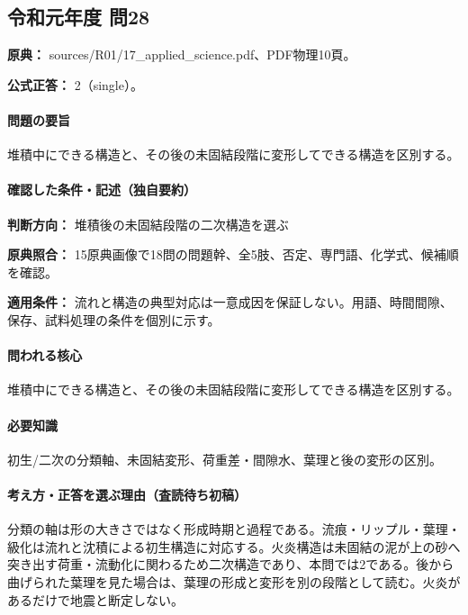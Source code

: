 \subsection{令和元年度 問28}
\label{q:r01-reg-applied-28}

\noindent\textbf{原典：} sources/R01/17\_applied\_science.pdf、PDF物理10頁。

\textbf{公式正答：} 2（single）。

\paragraph{問題の要旨} 堆積中にできる構造と、その後の未固結段階に変形してできる構造を区別する。

\paragraph{確認した条件・記述（独自要約）}\mbox{}\par

\noindent\textbf{判断方向：} 堆積後の未固結段階の二次構造を選ぶ\par

\noindent\textbf{原典照合：} 15原典画像で18問の問題幹、全5肢、否定、専門語、化学式、候補順を確認。\par

\noindent\textbf{適用条件：} 流れと構造の典型対応は一意成因を保証しない。用語、時間間隙、保存、試料処理の条件を個別に示す。\par

\paragraph{問われる核心} 堆積中にできる構造と、その後の未固結段階に変形してできる構造を区別する。

\paragraph{必要知識} 初生/二次の分類軸、未固結変形、荷重差・間隙水、葉理と後の変形の区別。

\paragraph{考え方・正答を選ぶ理由（査読待ち初稿）} 分類の軸は形の大きさではなく形成時期と過程である。流痕・リップル・葉理・級化は流れと沈積による初生構造に対応する。火炎構造は未固結の泥が上の砂へ突き出す荷重・流動化に関わるため二次構造であり、本問では2である。後から曲げられた葉理を見た場合は、葉理の形成と変形を別の段階として読む。火炎があるだけで地震と断定しない。

